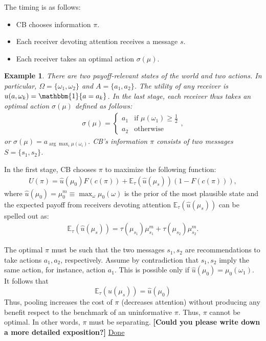\documentclass[12pt,a4paper]{article}
\newtheorem{example}{Example}
\begin{document}
The timing is as follows:
\begin{itemize}
    \item CB chooses information $\pi$.
    \item Each receiver devoting attention receives a message $s$. %
    \item Each receiver takes an optimal action $\sigma(\mu)$.
\end{itemize}

\begin{example}
    There are two payoff-relevant states of the world and two actions. In particular, $\Omega=\{\omega_1,\omega_2\}$ and $A=\{a_1,a_2\}$. The utility of any receiver is $u(a,\omega_k)=\mathbbm{1}\{a=a_{k}\}$. In the last stage, each receiver thus takes an optimal action $\sigma(\mu)$ defined as follows: 
    \begin{align}
        \sigma(\mu)=\left\{\begin{array}{ll}
        a_1   &  \mbox{if } \mu(\omega_1)\geq \frac{1}{2}\\
        a_2   &  \mbox{otherwise}
        \end{array}\right.,
    \end{align}
    or $\sigma(\mu) = a_{\arg\max_i\mu(\omega_i)}$. CB's information $\pi$ consists of two messages $S=\{s_1,s_2\}$.
\end{example}


In the first stage, CB chooses $\pi$ to maximize the following function:
\begin{align}
    U(\pi)=\hat{u}(\mu_0)F(c(\pi)) + \mathbb{E}_\tau(\hat{u}(\mu_s))(1-F(c(\pi))),
\end{align}
where $\hat{u}(\mu_0)=\mu_0^m\equiv\max_{\omega}\mu_0(\omega)$ is the prior of the most plausible state and the expected payoff from receivers devoting attention $\mathbb{E}_\tau(\hat{u}(\mu_s))$ can be spelled out as:
\begin{align}
    \mathbb{E}_\tau(\hat{u}(\mu_s)) = \tau(\mu_{s_1})\mu^m_{s_1} + \tau(\mu_{s_2})\mu^m_{s_2}.
\end{align}

The optimal $\pi$ must be such that the two messages $s_1,s_2$ are recommendations to take actions $a_1,a_2$, respectively. Assume by contradiction that $s_1,s_2$ imply the same action, for instance, action $a_1$. This is possible only if $\hat{u}(\mu_0)=\mu_0(\omega_1)$. It follows that
$$\mathbb{E}_\tau(\hat{u}(\mu_s)) =\hat{u}(\mu_0)$$
Thus, pooling increases the cost of $\pi$ (decreases attention) without producing any benefit respect to the benchmark of an uninformative $\pi$. Thus, $\pi$ cannot be optimal. In other words, $\pi$ must be separating. \textbf{[Could you please write down a more detailed exposition?]} \underline{Done}
\end{document}
